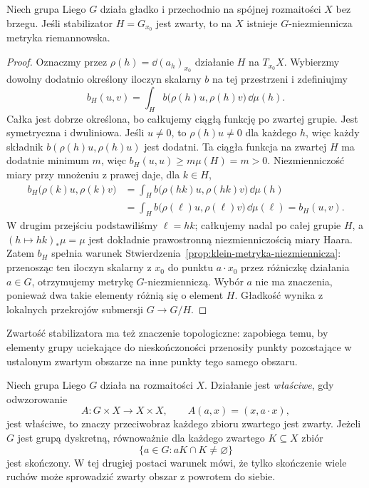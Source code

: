 \begin{stwierdzenie}
\label{prop:klein-zwarty-stabilizator-metryka}
Niech grupa Liego $G$ działa gładko i przechodnio na spójnej
rozmaitości $X$ bez brzegu. Jeśli stabilizator $H=G_{x_0}$ jest
zwarty, to na $X$ istnieje $G$-niezmiennicza metryka
riemannowska.
\end{stwierdzenie}
\begin{proof}
Oznaczmy przez $\rho(h)=\dd(a_h)_{x_0}$ działanie $H$
na $T_{x_0}X$. Wybierzmy dowolny dodatnio określony iloczyn
skalarny $b$ na tej przestrzeni i zdefiniujmy
\[
 b_H(u,v)=\int_H b\bigl(\rho(h)u,\rho(h)v\bigr)\,\dd\mu(h).
\]
Całka jest dobrze określona, bo całkujemy ciągłą funkcję po
zwartej grupie. Jest symetryczna i dwuliniowa. Jeśli $u\ne0$,
to $\rho(h)u\ne0$ dla każdego $h$, więc każdy składnik
$b(\rho(h)u,\rho(h)u)$ jest dodatni.
Ta ciągła funkcja na zwartej $H$ ma dodatnie minimum $m$,
więc $b_H(u,u)\geq m\mu(H)=m>0$.
Niezmienniczość miary przy mnożeniu z prawej daje, dla $k\in H$,
\begin{align*}
 b_H\bigl(\rho(k)u,\rho(k)v\bigr)
 &=\int_H b\bigl(\rho(hk)u,\rho(hk)v\bigr)\,\dd\mu(h)\\
 &=\int_H b\bigl(\rho(\ell)u,\rho(\ell)v\bigr)\,\dd\mu(\ell)
 =b_H(u,v).
\end{align*}
W drugim przejściu podstawiliśmy $\ell=hk$;
całkujemy nadal po całej grupie $H$, a
$(h\mapsto hk)_*\mu=\mu$ jest dokładnie prawostronną
niezmienniczością miary Haara.
Zatem $b_H$ spełnia warunek
Stwierdzenia~\ref{prop:klein-metryka-niezmiennicza}:
przenosząc ten iloczyn skalarny z $x_0$ do punktu
$a\cdot x_0$ przez różniczkę działania $a\in G$, otrzymujemy
metrykę $G$-niezmienniczą. Wybór $a$ nie ma znaczenia,
ponieważ dwa takie elementy różnią się o element $H$.
Gładkość wynika z lokalnych przekrojów submersji $G\to G/H$.
\end{proof}

Zwartość stabilizatora ma też znaczenie topologiczne: zapobiega
temu, by elementy grupy uciekające do nieskończoności przenosiły
punkty pozostające w ustalonym zwartym obszarze na inne punkty
tego samego obszaru.

\begin{definicja}
\label{def:klein-dzialanie-wlasciwe}
Niech grupa Liego $G$ działa na rozmaitości $X$.
Działanie jest \emph{właściwe}, gdy odwzorowanie
\[
 A:G\times X\longrightarrow X\times X,
 \qquad A(a,x)=(x,a\cdot x),
\]
jest właściwe, to znaczy przeciwobraz każdego zbioru zwartego
jest zwarty. Jeżeli $G$ jest grupą dyskretną, równoważnie
dla każdego zwartego $K\subseteq X$ zbiór
\[
 \{a\in G:aK\cap K\ne\varnothing\}
\]
jest skończony. W tej drugiej postaci warunek mówi, że tylko
skończenie wiele ruchów może sprowadzić zwarty obszar z powrotem
do siebie.
\end{definicja}

